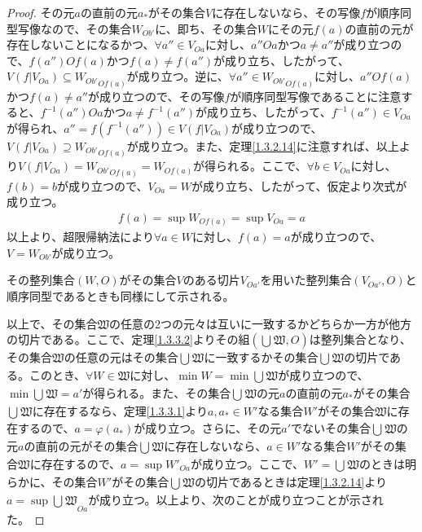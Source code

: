 \documentclass[dvipdfmx]{jsarticle}
\begin{document}
\begin{proof}
その元$a$の直前の元$a_{*}$がその集合$V$に存在しないなら、その写像$f$が順序同型写像なので、その集合$W_{Ob'}$に、即ち、その集合$W$にその元$f(a)$の直前の元が存在しないことになるかつ、$\forall a'' \in V_{Oa}$に対し、$a''Oa$かつ$a \neq a''$が成り立つので、$f\left( a'' \right)Of(a)$かつ$f(a) \neq f\left( a'' \right)$が成り立ち、したがって、$V\left( f|V_{Oa} \right) \subseteq {W_{Ob'}}_{Of(a)}$が成り立つ。逆に、$\forall a'' \in {W_{Ob'}}_{Of(a)}$に対し、$a''Of(a)$かつ$f(a) \neq a''$が成り立つので、その写像$f$が順序同型写像であることに注意すると、$f^{- 1}\left( a'' \right)Oa$かつ$a \neq f^{- 1}\left( a'' \right)$が成り立ち、したがって、$f^{- 1}\left( a'' \right) \in V_{Oa}$が得られ、$a'' = f\left( f^{- 1}\left( a'' \right) \right) \in V\left( f|V_{Oa} \right)$が成り立つので、$V\left( f|V_{Oa} \right) \supseteq {W_{Ob'}}_{Of(a)}$が成り立つ。また、定理\ref{1.3.2.14}に注意すれば、以上より$V\left( f|V_{Oa} \right) = {W_{Ob'}}_{Of(a)} = W_{Of(a)}$が得られる。ここで、$\forall b \in V_{Oa}$に対し、$f(b) = b$が成り立つので、$V_{Oa} = W$が成り立ち、したがって、仮定より次式が成り立つ。
\begin{align*}
f(a) = \sup W_{Of(a)} = \sup V_{Oa} = a
\end{align*}
以上より、超限帰納法により$\forall a \in W$に対し、$f(a) = a$が成り立つので、$V = W_{Ob'}$が成り立つ。\par
その整列集合$(W,O)$がその集合$V$のある切片$V_{Oa'}$を用いた整列集合$\left( V_{Oa'},O \right)$と順序同型であるときも同様にして示される。\par
以上で、その集合$\mathfrak{W}$の任意の2つの元々は互いに一致するかどちらか一方が他方の切片である。ここで、定理\ref{1.3.3.2}よりその組$\left( \bigcup_{} \mathfrak{W},O \right)$は整列集合となり、その集合$\mathfrak{W}$の任意の元はその集合$\bigcup_{} \mathfrak{W}$に一致するかその集合$\bigcup_{} \mathfrak{W}$の切片である。このとき、$\forall W \in \mathfrak{W}$に対し、$\min W = \min{\bigcup_{} \mathfrak{W}}$が成り立つので、$\min{\bigcup_{} \mathfrak{W}} = a'$が得られる。また、その集合$\bigcup_{} \mathfrak{W}$の元$a$の直前の元$a_{*}$がその集合$\bigcup_{} \mathfrak{W}$に存在するなら、定理\ref{1.3.3.1}より$a,a_{*} \in W'$なる集合$W'$がその集合$\mathfrak{W}$に存在するので、$a = \varphi\left( a_{*} \right)$が成り立つ。さらに、その元$a'$でないその集合$\bigcup_{} \mathfrak{W}$の元$a$の直前の元がその集合$\bigcup_{} \mathfrak{W}$に存在しないなら、$a \in W'$なる集合$W'$がその集合$\mathfrak{W}$に存在するので、$a = \sup{W'}_{Oa}$が成り立つ。ここで、$W' = \bigcup_{} \mathfrak{W}$のときは明らかに、その集合$W'$がその集合$\bigcup_{} \mathfrak{W}$の切片であるときは定理\ref{1.3.2.14}より$a = \sup{\bigcup_{} \mathfrak{W}}_{Oa}$が成り立つ。以上より、次のことが成り立つことが示された。

\end{proof}
\end{document}
